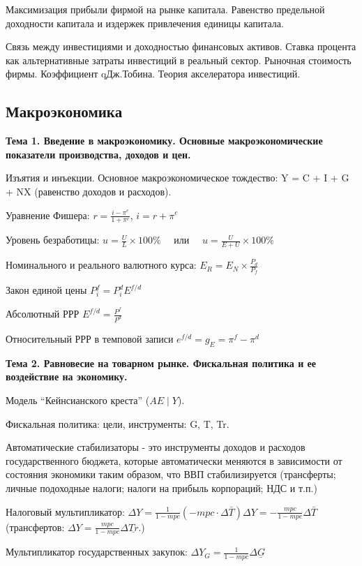 \documentclass[a4paper,8pt]{article} %
\begin{document}
Максимизация прибыли фирмой на рынке
капитала. Равенство предельной доходности капитала и издержек
привлечения единицы капитала. 

Связь между инвестициями и доходностью
финансовых активов. Ставка процента как альтернативные затраты
инвестиций в реальный сектор. Рыночная стоимость фирмы. Коэффициент
qДж.Тобина. Теория акселератора инвестиций.

\newpage

\subsection*{Макроэкономика}


\textbf{Тема 1. Введение в макроэкономику. Основные
макроэкономические показатели производства, доходов и
цен.}

Изъятия и инъекции. Основное макроэкономическое тождество: Y = C + I + G + NX (равенство доходов и расходов).

Уравнение Фишера: $r=\frac{i-\pi^{e}}{1+\pi^{e}}$,  $i=r+\pi^{e}$

Уровень безработицы: $u=\frac{U}{L} \times 100 \% \quad$ или $\quad u=\frac{U}{E+U} \times 100 \%$

Номинального и реального валютного курса: $E_{R}=E_{N} \times \frac{P_{d}}{P_{f}}$

Закон единой цены
$
P_{i}^{f}=P_{i}^{d} E^{f / d}
$

Абсолютный РРР
$
E^{f / d}=\frac{P^{f}}{P^{d}}
$

Относительный РРР в темповой записи
$
e^{f / d}=g_{E}=\pi^{f}-\pi^{d}
$


\textbf{Тема 2. Равновесие на товарном рынке. Фискальная политика и
ее воздействие на экономику.}

Модель ``Кейнсианского креста'' ($AE \mid Y$). 

Фискальная политика: цели, инструменты: G, T, Tr. 

Автоматические стабилизаторы - это инструменты доходов и расходов государственного бюджета, которые автоматически меняются в зависимости от состояния экономики таким образом, что ВВП стабилизируется (трансферты; личные подоходные налоги;
налоги на прибыль корпораций; НДС и т.п.) 

Налоговый мультипликатор:  $\Delta Y=\frac{1}{1-m p c}(-m p c \cdot \Delta \bar{T}) \Delta Y=-\frac{m p c}{1-m p c} \Delta \bar{T}$  (трансфертов: $\Delta Y=\frac{m p c}{1-m p c}  \Delta \underline{T r} .$)

Мультипликатор государственных закупок: $\Delta Y_{G}=\frac{1}{1-m p c} \Delta \underline{G}$
\end{document}
